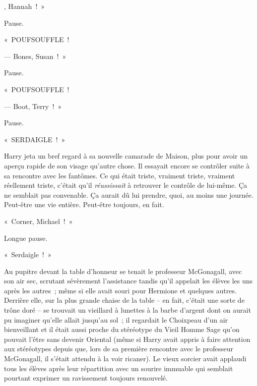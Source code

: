 
, Hannah~!~»

\hplettrineextrapara
Pause.

«~POUFSOUFFLE~!

--- Bones, Susan~!~»

Pause.

«~POUFSOUFFLE~!

--- Boot, Terry~!~»

Pause.

«~SERDAIGLE~!~»

Harry jeta un bref regard à sa nouvelle camarade de Maison, plus pour avoir un aperçu rapide de son visage qu'autre chose. Il essayait encore se contrôler suite à sa rencontre avec les fantômes. Ce qui était triste, vraiment triste, vraiment réellement triste, c'était qu'il \emph{réussissait} à retrouver le contrôle de lui-même. Ça ne semblait pas convenable. Ça aurait dû lui prendre, quoi, au moins une journée. Peut-être une vie entière. Peut-être toujours, en fait.

«~Corner, Michael~!~»

Longue pause.

«~Serdaigle~!~»

Au pupitre devant la table d'honneur se tenait le professeur McGonagall, avec son air sec, scrutant sévèrement l'assistance tandis qu'il appelait les élèves les uns après les autres~; même si elle avait souri pour Hermione et quelques autres. Derrière elle, sur la plus grande chaise de la table -- en fait, c'était une sorte de trône doré -- se trouvait un vieillard à lunettes à la barbe d'argent dont on aurait pu imaginer qu'elle allait jusqu'au sol~; il regardait le Choixpeau d'un air bienveillant et il était aussi proche du stéréotype du Vieil Homme Sage qu'on pouvait l'être sans devenir Oriental (même si Harry avait appris à faire attention aux stéréotypes depuis que, lors de sa première rencontre avec le professeur McGonagall, il s'était attendu à la voir ricaner). Le vieux sorcier avait applaudi tous les élèves après leur répartition avec un sourire immuable qui semblait pourtant exprimer un ravissement toujours renouvelé.

